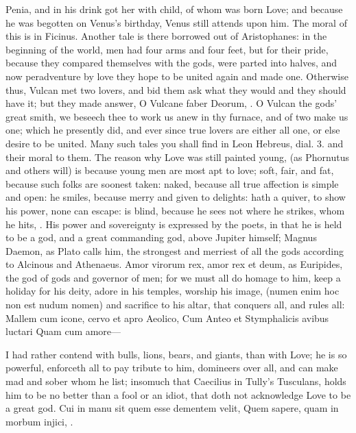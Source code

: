 Penia, and in his drink got her with child, of whom was born Love; and
because he was begotten on Venus's birthday, Venus still attends upon
him. The moral of this is in Ficinus. Another tale is there
borrowed out of Aristophanes: in the beginning of the world, men
had four arms and four feet, but for their pride, because they compared
themselves with the gods, were parted into halves, and now peradventure
by love they hope to be united again and made one. Otherwise thus,
Vulcan met two lovers, and bid them ask what they would and they
should have it; but they made answer, O Vulcane faber Deorum, \etc{}. O
Vulcan the gods' great smith, we beseech thee to work us anew in thy
furnace, and of two make us one; which he presently did, and ever since
true lovers are either all one, or else desire to be united. Many such
tales you shall find in Leon Hebreus, dial. 3. and their moral to them.
The reason why Love was still painted young, (as Phornutus and
others will) is because young men are most apt to love; soft,
fair, and fat, because such folks are soonest taken: naked, because all
true affection is simple and open: he smiles, because merry and given
to delights: hath a quiver, to show his power, none can escape: is
blind, because he sees not where he strikes, whom he hits, \etc{}. His
power and sovereignty is expressed by the poets, in that he is
held to be a god, and a great commanding god, above Jupiter himself;
Magnus Daemon, as Plato calls him, the strongest and merriest of all
the gods according to Alcinous and Athenaeus. Amor virorum rex,
amor rex et deum, as Euripides, the god of gods and governor of men;
for we must all do homage to him, keep a holiday for his deity, adore
in his temples, worship his image, (numen enim hoc non est nudum nomen)
and sacrifice to his altar, that conquers all, and rules all:
Mallem cum icone, cervo et apro Aeolico,
Cum Anteo et Stymphalicis avibus luctari
Quam cum amore---

I had rather contend with bulls, lions, bears, and giants, than with
Love; he is so powerful, enforceth all to pay tribute to him,
domineers over all, and can make mad and sober whom he list; insomuch
that Caecilius in Tully's Tusculans, holds him to be no better than a
fool or an idiot, that doth not acknowledge Love to be a great god.
Cui in manu sit quem esse dementem velit,
Quem sapere, quam in morbum injici, \etc{}.

